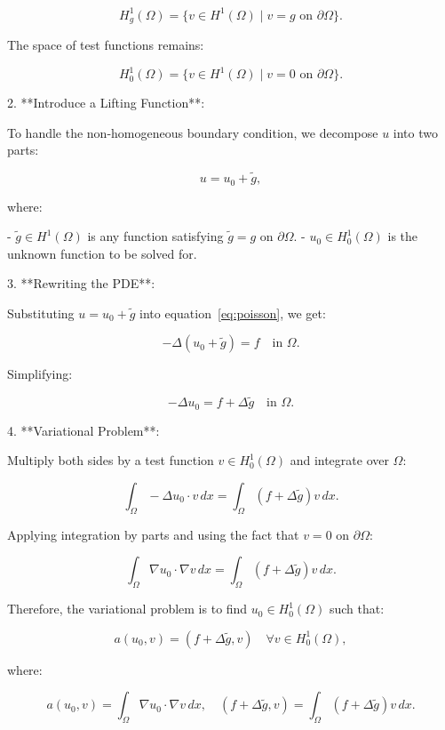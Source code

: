 \documentclass[class=article, crop=false]{standalone}
\begin{document}
   \[
   H_g^1(\Omega) = \{ v \in H^1(\Omega) \mid v = g \text{ on } \partial \Omega \}.
   \]

   The space of test functions remains:

   \[
   H_0^1(\Omega) = \{ v \in H^1(\Omega) \mid v = 0 \text{ on } \partial \Omega \}.
   \]

2. **Introduce a Lifting Function**:

   To handle the non-homogeneous boundary condition, we decompose $u$ into two parts:

   \[
   u = u_0 + \tilde{g},
   \]

   where:

   - $\tilde{g} \in H^1(\Omega)$ is any function satisfying $\tilde{g} = g$ on $\partial \Omega$.
   - $u_0 \in H_0^1(\Omega)$ is the unknown function to be solved for.

3. **Rewriting the PDE**:

   Substituting $u = u_0 + \tilde{g}$ into equation~\eqref{eq:poisson}, we get:

   \[
   -\Delta (u_0 + \tilde{g}) = f \quad \text{in } \Omega.
   \]

   Simplifying:

   \[
   -\Delta u_0 = f + \Delta \tilde{g} \quad \text{in } \Omega.
   \]

4. **Variational Problem**:

   Multiply both sides by a test function $v \in H_0^1(\Omega)$ and integrate over $\Omega$:

   \[
   \int_\Omega -\Delta u_0 \cdot v \, dx = \int_\Omega (f + \Delta \tilde{g}) v \, dx.
   \]

   Applying integration by parts and using the fact that $v = 0$ on $\partial \Omega$:

   \[
   \int_\Omega \nabla u_0 \cdot \nabla v \, dx = \int_\Omega (f + \Delta \tilde{g}) v \, dx.
   \]

   Therefore, the variational problem is to find $u_0 \in H_0^1(\Omega)$ such that:

   \begin{equation}
   a(u_0, v) = (f + \Delta \tilde{g}, v) \quad \forall v \in H_0^1(\Omega), \label{eq:variational}
   \end{equation}

   where:

   \[
   a(u_0, v) = \int_\Omega \nabla u_0 \cdot \nabla v \, dx, \quad (f + \Delta \tilde{g}, v) = \int_\Omega (f + \Delta \tilde{g}) v \, dx.
   \]
\end{document}
